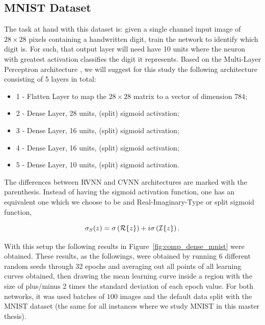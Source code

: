 \subsection{MNIST Dataset}
\label{mnist_dense}

The task at hand with this dataset is: given a single channel input image of $ 28 \times 28 $ pixels containing a handwritten digit, train the network to identify which digit is. For such, that output layer will need have 10 units where the neuron with greatest activation classifies the digit it represents. Based on the Multi-Layer Perceptron architecture \parencite{rumelhart1986}, we will suggest for this study the following architecture consisting of 5 layers in total:

\begin{itemize}
	\item 1 - Flatten Layer to map the $ 28 \times 28 $ matrix to a vector of dimension $ 784 $;
	\item 2 - Dense Layer, 28 units, (split) sigmoid activation;
	\item 3 - Dense Layer, 16 units, (split) sigmoid activation;
	\item 4 - Dense Layer, 16 units, (split) sigmoid activation;
	\item 5 - Dense Layer, 10 units, (split) sigmoid activation.
\end{itemize}

The differences between RVNN and CVNN architectures are marked with the parenthesis. Instead of having the sigmoid activation function, one has an equivalent one which we choose to be and Real-Imaginary-Type or split sigmoid function,

\begin{equation}
	\sigma_{S}(z) = \sigma\left( \mathcal{R}\{ z \} \right) + i\sigma\left( \mathcal{I}\{ z \} \right).
\end{equation}

With this setup the following results in Figure~\ref{fig:comp_dense_mnist} were obtained. These results, as the followings, were obtained by running 6 different random seeds through 32 epochs and averaging out all points of all learning curves obtained, then drawing the mean learning curve inside a region with the size of plus/minus 2 times the standard deviation of each epoch value. For both networks, it was used batches of $ 100 $ images and the default data split with the MNIST dataset (the same for all instances where we study MNIST in this master thesis).


